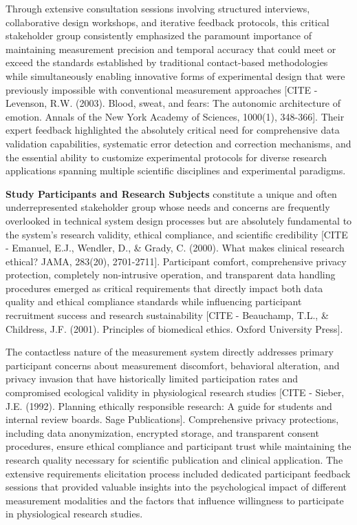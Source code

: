 \documentclass[11pt,a4paper]{report}
\begin{document}
Through extensive consultation sessions involving structured interviews, collaborative design workshops, and iterative
feedback protocols, this critical stakeholder group consistently emphasized the paramount importance of maintaining
measurement precision and temporal accuracy that could meet or exceed the standards established by traditional
contact-based methodologies while simultaneously enabling innovative forms of experimental design that were previously
impossible with conventional measurement
approaches [CITE - Levenson, R.W. (2003). Blood, sweat, and fears: The autonomic architecture of emotion. Annals of the New York Academy of Sciences, 1000(1), 348-366].
Their expert feedback highlighted the absolutely critical need for comprehensive data validation capabilities,
systematic error detection and correction mechanisms, and the essential ability to customize experimental protocols for
diverse research applications spanning multiple scientific disciplines and experimental paradigms.

\textbf{Study Participants and Research Subjects} constitute a unique and often underrepresented stakeholder group whose
needs and concerns are frequently overlooked in technical system design processes but are absolutely fundamental to the
system's research validity, ethical compliance, and scientific
credibility [CITE - Emanuel, E.J., Wendler, D., \& Grady, C. (2000). What makes clinical research ethical? JAMA, 283(20), 2701-2711].
Participant comfort, comprehensive privacy protection, completely non-intrusive operation, and transparent data handling
procedures emerged as critical requirements that directly impact both data quality and ethical compliance standards
while influencing participant recruitment success and research
sustainability [CITE - Beauchamp, T.L., \& Childress, J.F. (2001). Principles of biomedical ethics. Oxford University Press].

The contactless nature of the measurement system directly addresses primary participant concerns about measurement
discomfort, behavioral alteration, and privacy invasion that have historically limited participation rates and
compromised ecological validity in physiological research
studies [CITE - Sieber, J.E. (1992). Planning ethically responsible research: A guide for students and internal review boards. Sage Publications].
Comprehensive privacy protections, including data anonymization, encrypted storage, and transparent consent procedures,
ensure ethical compliance and participant trust while maintaining the research quality necessary for scientific
publication and clinical application. The extensive requirements elicitation process included dedicated participant
feedback sessions that provided valuable insights into the psychological impact of different measurement modalities and
the factors that influence willingness to participate in physiological research studies.
\end{document}
